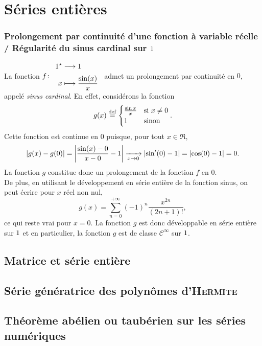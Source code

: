 \chapter{Séries entières}


\subsection{Prolongement par continuité d'une fonction à variable réelle / Régularité du sinus cardinal sur $1$}

La fonction $\fonction[f]{\Re}{\R}{x}{\frac{\sin(x)}{x}}$ admet un prolongement par continuité en $0$, appelé \emph{sinus cardinal}. En effet, considérons la fonction
\[
    g(x) \overset{\mathrm{\tiny def}}{=}
    \begin{cases} 
        \frac{\sin x}{x} &\text{si } x \not= 0 \\ 
        1 &\text{sinon} 
    \end{cases}.
\]
Cette fonction est continue en $0$ puisque, pour tout $x \in \Re$,
\[
\left| g(x) - g(0) \right| = \left| \frac{\sin(x) - 0}{x - 0} - 1 \right| \xrightarrow[x \to 0]{} \left| \sin'(0) - 1 \right| = \left| \cos(0) - 1 \right| = 0. 
\]
La fonction $g$ constitue donc un prolongement de la fonction $f$ en $0$. \\
De plus, en utilisant le développement en série entière de la fonction sinus, on peut écrire pour $x$ réel non nul, 
\[
g(x) = \sum\limits_{n=0}^{+ \infty} (-1)^n \frac{x^{2n}}{(2n+1)!},
\]
ce qui reste vrai pour $x = 0$. La fonction $g$ est donc développable en série entière sur $1$ et en particulier, la fonction $g$ est de classe $\mathscr{C}^\infty$ sur $1$.


\section{Matrice et série entière}


\section{Série génératrice des polynômes d'\textsc{Hermite}}


\section{Théorème abélien ou taubérien sur les séries numériques}



